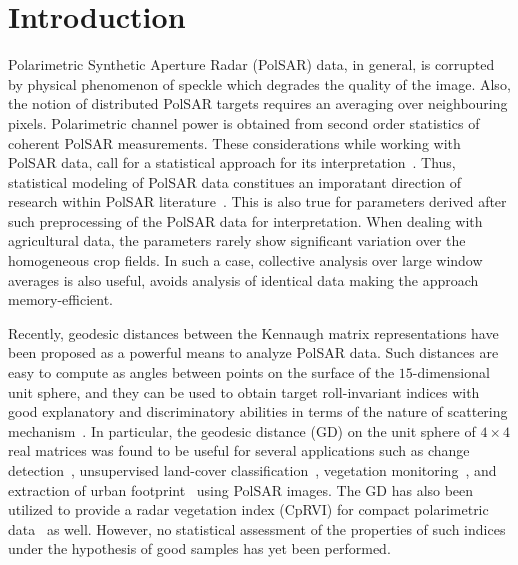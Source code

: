\documentclass[journal]{IEEEtran}
\begin{document}
	\section{Introduction}
	Polarimetric Synthetic Aperture Radar (PolSAR) data, in general, is corrupted by physical phenomenon of speckle which degrades the quality of the image. Also, the notion of distributed PolSAR targets requires an averaging over neighbouring pixels. Polarimetric channel power is obtained from second order statistics of coherent PolSAR measurements. These considerations while working with PolSAR data, call for a statistical approach for its interpretation~\cite{Pottier09}. 
	Thus, statistical modeling of PolSAR data constitues an imporatant direction of research within PolSAR literature~\cite{Deng_2017}. %
	This is also true for parameters derived after such preprocessing of the PolSAR data for interpretation. When dealing with agricultural data, the parameters rarely show significant variation over the homogeneous crop fields. In such a case, collective analysis over large window averages is also useful, avoids analysis of identical data making the approach memory-efficient.%
	
	Recently, geodesic distances between the Kennaugh matrix representations have been proposed as a powerful means to analyze PolSAR data. Such distances are easy to compute as angles between points on the surface of the $15$-dimensional unit sphere, and they can be used to obtain target roll-invariant indices with good explanatory and discriminatory abilities in terms of the nature of scattering mechanism~\cite{APolSARScatteringPowerFactorizationFrameworkandNovelRollInvariantParametersBasedUnsupervisedClassificationSchemeUsingaGeodesicDistanceinpress}. In particular, the geodesic distance ($\text{GD}$) on the unit sphere of $4 \times 4$ real matrices was found to be useful for several applications such as change detection~\cite{ChangeDetectionPolSARGeodesicDistanceBetweenScatteringMechanisms}, 
	unsupervised land-cover classification~\cite{ClassificationPolSARGeodesic}, 
	vegetation monitoring~\cite{AGeneralizedVolumeScatteringModelBasedVegetationIndexfromPolarimetricSARData2019}, and 
	extraction of urban footprint~\cite{NovelTechniquesforBuiltupAreaExtractionfromPolarimetricSARImages2019} using PolSAR images. The GD has also been utilized to provide a radar vegetation index (CpRVI) for compact polarimetric data~\cite{ARadarVegetationIndexforCropMonitoringUsingCompactPolarimetricSARData} as well. However, no statistical assessment of the properties of such indices under the hypothesis of good samples has yet been performed.%
	
\end{document}
